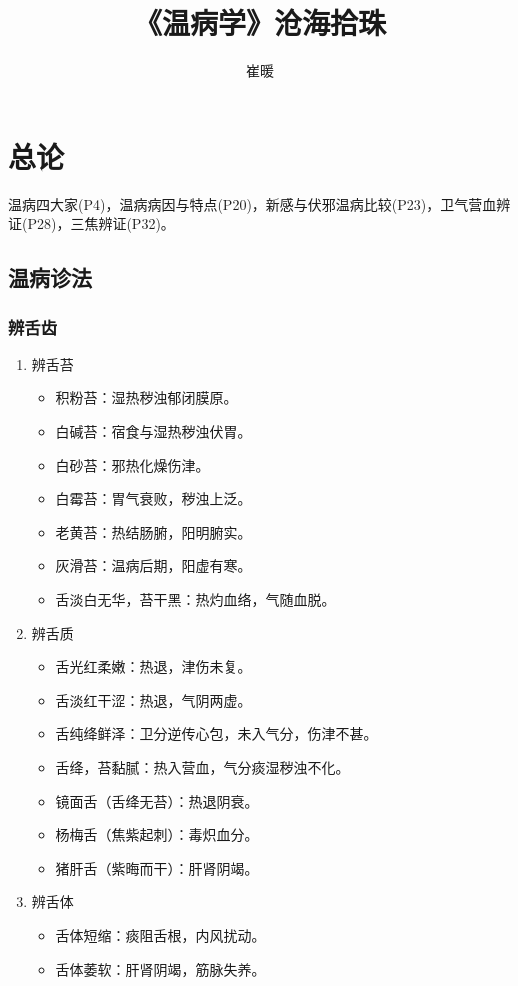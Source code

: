 \documentclass[cn,black,12pt,founder,normal,twocolumn]{elegantnote}
\title{《温病学》沧海拾珠}
\author{崔暖}
\date{\zhtoday}
\begin{document}
\maketitle

\section{总论}

温病四大家(P4)，温病病因与特点(P20)，新感与伏邪温病比较(P23)，卫气营血辨证(P28)，三焦辨证(P32)。

\subsection{温病诊法}

\subsubsection{辨舌齿}

\begin{enumerate}
    \item 辨舌苔
    \begin{itemize}
        \item 积粉苔：湿热秽浊郁闭膜原。
        \item 白碱苔：宿食与湿热秽浊伏胃。
        \item 白砂苔：邪热化燥伤津。
        \item 白霉苔：胃气衰败，秽浊上泛。
        \item 老黄苔：热结肠腑，阳明腑实。
        \item 灰滑苔：温病后期，阳虚有寒。
        \item 舌淡白无华，苔干黑：热灼血络，气随血脱。
    \end{itemize}
    \item 辨舌质
    \begin{itemize}
        \item 舌光红柔嫩：热退，津伤未复。
        \item 舌淡红干涩：热退，气阴两虚。
        \item 舌纯绛鲜泽：卫分逆传心包，未入气分，伤津不甚。
        \item 舌绛，苔黏腻：热入营血，气分痰湿秽浊不化。
        \item 镜面舌（舌绛无苔）：热退阴衰。
        \item 杨梅舌（焦紫起刺）：毒炽血分。
        \item 猪肝舌（紫晦而干）：肝肾阴竭。
    \end{itemize}
    \item 辨舌体
    \begin{itemize}
        \item 舌体短缩：痰阻舌根，内风扰动。
        \item 舌体萎软：肝肾阴竭，筋脉失养。
    \end{itemize}
\end{enumerate}
\end{document}

